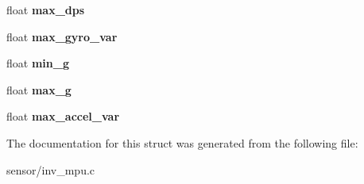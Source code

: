 \begin{DoxyCompactItemize}
\item 
float {\bfseries max\+\_\+dps}\hypertarget{structtest__s_a9085b0647fbd57e7ed8e0c4371ad1de2}{}\label{structtest__s_a9085b0647fbd57e7ed8e0c4371ad1de2}

\item 
float {\bfseries max\+\_\+gyro\+\_\+var}\hypertarget{structtest__s_a629a75454f5af8caaff2fe8388975d32}{}\label{structtest__s_a629a75454f5af8caaff2fe8388975d32}

\item 
float {\bfseries min\+\_\+g}\hypertarget{structtest__s_aa295cc026745ef7378eeff0c72638ed0}{}\label{structtest__s_aa295cc026745ef7378eeff0c72638ed0}

\item 
float {\bfseries max\+\_\+g}\hypertarget{structtest__s_a30dbaf47c9d41bf9e86370664d661bd0}{}\label{structtest__s_a30dbaf47c9d41bf9e86370664d661bd0}

\item 
float {\bfseries max\+\_\+accel\+\_\+var}\hypertarget{structtest__s_ad5bc54ab7d1b1a0f158ca1a79359c3bc}{}\label{structtest__s_ad5bc54ab7d1b1a0f158ca1a79359c3bc}

\end{DoxyCompactItemize}


The documentation for this struct was generated from the following file\+:\begin{DoxyCompactItemize}
\item 
sensor/inv\+\_\+mpu.\+c\end{DoxyCompactItemize}
